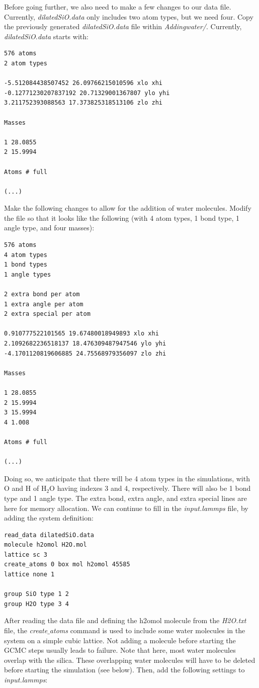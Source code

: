 \documentclass[9pt,tutorial]{livecoms}
\begin{document}
Before going further, we also need to make a few changes to our data file. Currently, \textit{dilatedSiO.data} only includes two atom types, but we need four. Copy the previously generated \textit{dilatedSiO.data} file within \textit{Addingwater/}. Currently, \textit{dilatedSiO.data} starts with:
{\normalsize \begin{verbatim}
576 atoms
2 atom types

-5.512084438507452 26.09766215010596 xlo xhi
-0.12771230207837192 20.71329001367807 ylo yhi
3.211752393088563 17.373825318513106 zlo zhi

Masses

1 28.0855
2 15.9994

Atoms # full

(...)
\end{verbatim}}
Make the following changes to allow for the addition of water molecules. Modify the file so that it looks like the following
(with 4 atom types, 1 bond type, 1 angle type, and four masses):
{\normalsize \begin{verbatim}
576 atoms
4 atom types
1 bond types
1 angle types

2 extra bond per atom
1 extra angle per atom
2 extra special per atom

0.910777522101565 19.67480018949893 xlo xhi
2.1092682236518137 18.476309487947546 ylo yhi
-4.1701120819606885 24.75568979356097 zlo zhi

Masses

1 28.0855
2 15.9994
3 15.9994
4 1.008

Atoms # full

(...)
\end{verbatim}}
Doing so, we anticipate that there will be 4 atom types in the simulations, with O and H of $\text{H}_2\text{O}$ having indexes 3 and 4,
respectively. There will also be 1 bond type and 1 angle type. The extra bond, extra angle, and extra special lines
are here for memory allocation. We can continue to fill in the \textit{input.lammps} file, by adding the system definition:
{\normalsize \begin{verbatim}
read_data dilatedSiO.data
molecule h2omol H2O.mol
lattice sc 3
create_atoms 0 box mol h2omol 45585
lattice none 1

group SiO type 1 2
group H2O type 3 4
\end{verbatim}}
After reading the data file and defining the h2omol molecule from the \textit{H2O.txt} file, the \textit{create$\_$atoms} command is used to include some water molecules in the system on a simple cubic lattice. Not adding a molecule before starting the GCMC steps usually leads to failure. Note that here, most water molecules overlap with the silica. These overlapping water molecules will have to be deleted before starting the simulation (see below). Then, add the following settings to \textit{input.lammps}:
\end{document}
